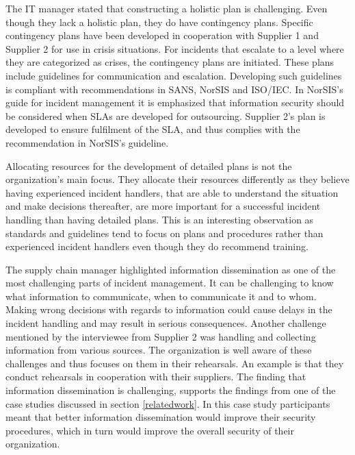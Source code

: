 The IT manager stated that constructing a holistic plan is challenging. Even though they lack a holistic plan, they do have contingency plans. Specific contingency plans have been developed in cooperation with Supplier 1 and Supplier 2 for use in crisis situations. For incidents that escalate to a level where they are categorized as crises, the contingency plans are initiated. These plans include guidelines for communication and escalation. Developing such guidelines is compliant with recommendations in SANS, NorSIS and ISO/IEC. In NorSIS's guide for incident management it is emphasized that information security should be considered when \acp{SLA} are developed for outsourcing. Supplier 2's plan is developed to ensure fulfilment of the \ac{SLA}, and thus complies with the recommendation in NorSIS's guideline. 

Allocating resources for the development of detailed plans is not the organization's main focus. They allocate their resources differently as they believe having experienced incident handlers, that are able to understand the situation and make decisions thereafter, are more important for a successful incident handling than having detailed plans. This is an interesting observation as standards and guidelines tend to focus on plans and procedures rather than experienced incident handlers even though they do recommend training. 

The supply chain manager highlighted information dissemination as one of the most challenging parts of incident management. It can be challenging to know what information to communicate, when to communicate it and to whom. Making wrong decisions with regards to information could cause delays in the incident handling and may result in serious consequences. Another challenge mentioned by the interviewee from Supplier 2 was handling and collecting information from various sources. The organization is well aware of these challenges and thus focuses on them in their rehearsals. An example is that they conduct rehearsals in cooperation with their suppliers. The finding that information dissemination is challenging, supports the findings from one of the case studies discussed in section \ref{relatedwork}. In this case study participants meant that better information dissemination would improve their security procedures, which in turn would improve the overall security of their organization. 

